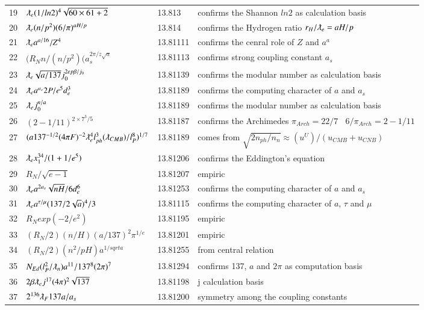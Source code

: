\documentclass[a4paper,9pt]{article}
\begin{document}
\begin{appendix}
\begin{table}
\begin{tabular}{llll}
    19 & $\lambdabar_{e} (1/ln2)^4\sqrt{60 \times 61+2} $ & 13.813 & confirms the Shannon $ln2$ as calculation basis\\
    20 & $\lambdabar_{e} (n/p^2) (6/\pi)^{aH/p}$ & 13.814 & confirms the Hydrogen ratio $r_H/\lambdabar_e = aH/p$\\
   21 & $\lambdabar_{e} a^{a/16} /Z^4$ & 13.81111 & confirms the cenral role of $Z$ and $a^a$\\
   22 & $(R_N n/ (n/p^2) (a_s^{2\pi/z\sqrt a}$ & 13.81113 & confirms strong coupling constant $a_s$\\
  23 & $ \lambdabar_{e} \sqrt{a/137} j_0^{2ep\beta/j_0}$ & 13.81139 & confirms the modular number as calculation basis\\ 
   24 & $\lambdabar_{e} a^{a_s} 2P/e^5d_e^3$ & 13.81189 & confirms the computing character of $a$ and $a_s$ \\
   25 & $\lambdabar_{e} j_0^{n/a}$ & 13.81189 & confirms the modular number as calculation basis\\
   26 & $(2-1/11)^{2\times 7^3/5}$ & 13.81187 & confirms the Archimedes $\pi_{Arch} = 22/7~~~~ 6/\pi_{Arch} =2-1/11$\\
   27 & $(a 137^{-1/2}(4\pi F)^{-2} \lambdabar_{e}^4 l_{ph}^3 (\lambdabar_{CMB})/l_P^8)^{1/7}$ & 13.81189 & comes from $\sqrt{2n_{ph}/n_n} \approx (u^U)/(u_{CMB}+u_{CNB})$\\
   28 & $\lambdabar_{e} x_1^{34} /(1+1/e^5)$ & 13.81206 & confirms the Eddington's equation\\
   29 & $R_N /\sqrt {e-1}$ & 13.81207 & empiric\\
    30 & $\lambdabar_{e} a^{2a_s} \sqrt{nH}/6d_e^6 $ & 13.81253 & confirms the computing character of $a$ and $a_s$\\
    31 & $\lambdabar_{e} a^{\tau / \mu} (137/2\sqrt a)^4 /3 $ & 13.81115 & confirms the computing character of $a$, $\tau$ and $\mu$\\
   32 & $R_N exp(-2/e^2)$ & 13.81195 & empiric\\
   33 & $(R_N/2)(n/H)(a/137)^2 \pi^{1/e}$ & 13.81201 & empiric\\ 
   34 & $(R_N/2)(n^2/pH)a^{1/sqrt a}$ & 13.81255 & from central relation\\  
   35 & $N_{Ed}(l_P^2/ \lambdabar_n) a^{11}/137^8 (2\pi)^7   $ & 13.81294 & confirms 137, $a$ and $2\pi$ as computation basis\\
  36 & $2\beta \lambdabar_{e} j^{17} (4\pi)^2 \sqrt{137}$ & 13.81198 & j calculation basis \\
  37 & $ 2^{136}\lambdabar_{F}137 a/a_s $ & 13.81200 & symmetry among the coupling constants \\

\end{tabular}
\end{table}
\end{appendix}
\end{document}
